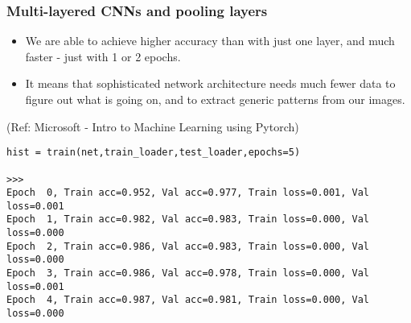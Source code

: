 \begin{frame}[fragile] \frametitle{Multi-layered CNNs and pooling layers}

\begin{itemize}

\item We are able to achieve higher accuracy than with just one layer, and much faster - just with 1 or 2 epochs. 
\item It means that sophisticated network architecture needs much fewer data to figure out what is going on, and to extract generic patterns from our images.
\end{itemize}


\tiny{(Ref: Microsoft - Intro to Machine Learning using Pytorch)}

\begin{lstlisting}
hist = train(net,train_loader,test_loader,epochs=5)

>>>
Epoch  0, Train acc=0.952, Val acc=0.977, Train loss=0.001, Val loss=0.001
Epoch  1, Train acc=0.982, Val acc=0.983, Train loss=0.000, Val loss=0.000
Epoch  2, Train acc=0.986, Val acc=0.983, Train loss=0.000, Val loss=0.000
Epoch  3, Train acc=0.986, Val acc=0.978, Train loss=0.000, Val loss=0.001
Epoch  4, Train acc=0.987, Val acc=0.981, Train loss=0.000, Val loss=0.000
\end{lstlisting}


\end{frame}







